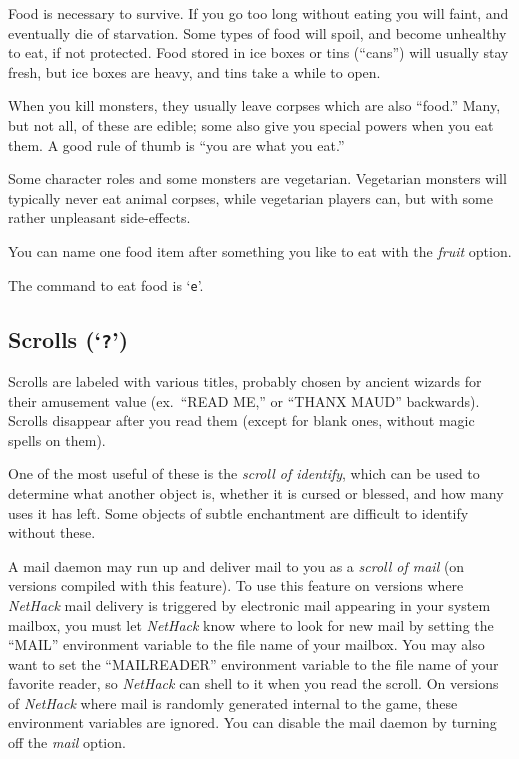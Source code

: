 Food is necessary to survive.  If you go too long without eating you
will faint, and eventually die of starvation.
Some types of food will spoil, and become unhealthy to eat,
if not protected.
Food stored in ice boxes or tins (``cans'')
will usually stay fresh, but ice boxes are heavy, and tins
take a while to open.

When you kill monsters, they usually leave corpses which are also
``food.''  Many, but not all, of these are edible; some also give you
special powers when you eat them.  A good rule of thumb is ``you are
what you eat.''

Some character roles and some monsters are vegetarian.  Vegetarian monsters
will typically never eat animal corpses, while vegetarian players can,
but with some rather unpleasant side-effects.

You can name one food item after something you like to eat with the
{\it fruit\/} option.

The command to eat food is `{\tt e}'.

\subsection*{Scrolls (`{\tt ?}')}

Scrolls are labeled with various titles, probably chosen by ancient wizards
for their amusement value (ex.\ ``READ ME,'' or ``THANX MAUD'' backwards).
Scrolls disappear after you read them (except for blank ones, without
magic spells on them).

One of the most useful of these is the %
{\it scroll of identify}, which
can be used to determine what another object is, whether it is cursed or
blessed, and how many uses it has left.  Some objects of subtle
enchantment are difficult to identify without these.

A mail daemon may run up and deliver mail to you as a %
{\it scroll of mail} (on versions compiled with this feature).
To use this feature on versions where {\it NetHack\/}
mail delivery is triggered by electronic mail appearing in your system mailbox,
you must let {\it NetHack\/} know where to look for new mail by setting the
``MAIL'' environment variable to the file name of your mailbox.
You may also want to set the ``MAILREADER'' environment variable to the
file name of your favorite reader, so {\it NetHack\/} can shell to it when you
read the scroll.
On versions of {\it NetHack\/} where mail is randomly
generated internal to the game, these environment variables are ignored.
You can disable the mail daemon by turning off the
{\it mail\/} option.

